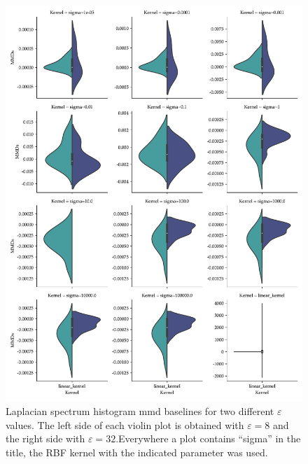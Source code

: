 \begin{figure}
  \centering
  \includegraphics[width=\textwidth]{./figures/results/laplacian_spectrum_baselines.pdf}
  \caption[Laplacian spectrum histogram \acrshort{mmd} baselines for two
different $\varepsilon$ values.]{Laplacian spectrum histogram \acrshort{mmd}
baselines for two different $\varepsilon$ values. The left side of each violin
plot is obtained with $\varepsilon=8$ and the right side with
$\varepsilon=32$.Everywhere a plot contains ``sigma'' in the title, the RBF
kernel with the indicated parameter was used.}
\end{figure}


